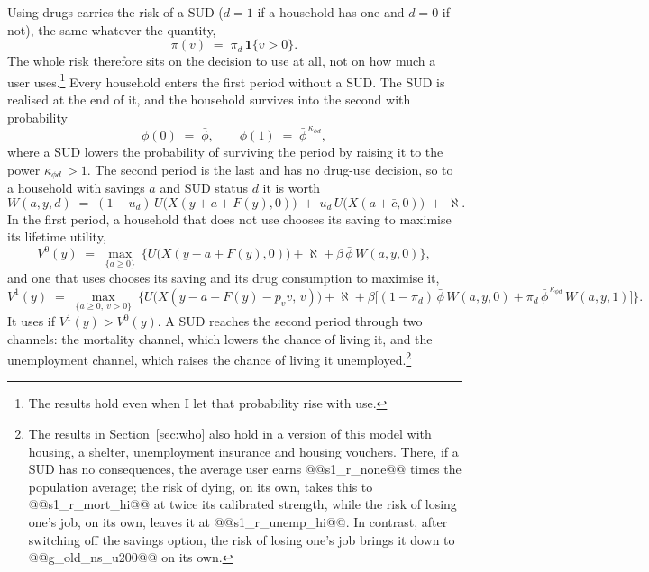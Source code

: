 \documentclass[10pt]{article}
\begin{document}
Using drugs carries the risk of a SUD ($d=1$ if a household has one and $d=0$ if not), the same whatever the quantity,
\begin{equation}\label{eq:hazard}
\pi(v) \;=\; \pi_d\,\mathbf{1}\{v>0\}.
\end{equation}
The whole risk therefore sits on the decision to use
at all, not on how much a user uses.\footnote{The results hold even when I let that probability rise with use.} Every household enters the first period without a SUD. The SUD is realised at the end of it, and the household survives into the second with probability
\begin{equation}\label{eq:surv}
\phi(0) \;=\; \bar\phi, \qquad \phi(1) \;=\; \bar\phi^{\,\kappa_{\phi d}},
\end{equation}
where a SUD lowers the probability of surviving the period by raising it to the power $\kappa_{\phi d}$$\,>1$. The second period is the last and has no drug-use decision, so to a household with savings $a$ and SUD status $d$ it is worth
\begin{equation}\label{eq:w2}
W(a,y,d) \;=\; (1-u_d)\,U\big(X(y+a+F(y),0)\big)\;+\;u_d\,U\big(X(a+\bar c,0)\big)\;+\;\aleph.
\end{equation}
In the first period, a household that does not use chooses its saving to maximise its lifetime utility,
\begin{equation}\label{eq:v0}
V^0(y) \;=\; \max_{\{a\ge0\}}\ \Big\{U\big(X(y-a+F(y),0)\big)+\aleph+\beta\,\bar\phi\,W(a,y,0)\Big\},
\end{equation}
and one that uses chooses its saving and its drug consumption to maximise it,
\begin{equation}\label{eq:v1}
V^1(y) \;=\; \max_{\{a\ge0,\ v>0\}}\ \Big\{U\big(X(y-a+F(y)-p_v v,\,v)\big)+\aleph+\beta\Big[(1-\pi_d)\,\bar\phi\,W(a,y,0)+\pi_d\,\bar\phi^{\,\kappa_{\phi d}}\,W(a,y,1)\Big]\Big\}.
\end{equation}
It uses if $V^1(y)>V^0(y)$. A SUD reaches the second period through two channels: the mortality channel, which lowers the chance of living it, and the unemployment channel, which raises the chance of living it unemployed.\footnote{The results in Section~\ref{sec:who} also hold in a version of this model with housing, a shelter, unemployment insurance and housing vouchers. There, if a SUD has no consequences, the average user earns @@s1_r_none@@ times the population average; the risk of dying, on its own, takes this to @@s1_r_mort_hi@@ at twice its calibrated strength, while the risk of losing one's job, on its own, leaves it at @@s1_r_unemp_hi@@.   In contrast, after switching off the savings option, the risk of losing one's job brings it down to @@g_old_ns_u200@@ on its own.}
\end{document}
